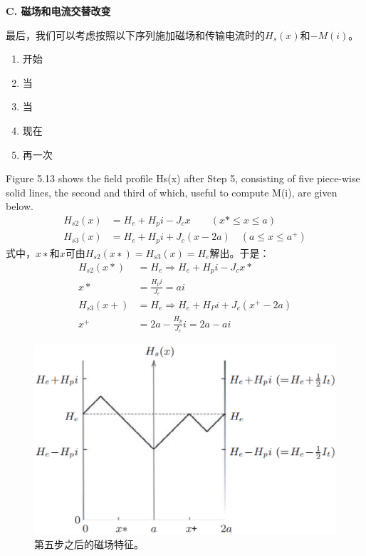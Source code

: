 \textbf{C. 磁场和电流交替改变}

最后，我们可以考虑按照以下序列施加磁场和传输电流时的$H_s(x)$和$−M(i)$。

\begin{enumerate}
	\item 开始
	\item 当
	\item 当
	\item 现在
	\item 再一次
\end{enumerate}

Figure 5.13 shows the field profile Hs(x) after Step 5, consisting of five piece-wise
solid lines, the second and third of which, useful to compute M(i), are given below.
\begin{align*}
H_{s2}(x)&=H_{e}+H_{p}i-J_{c}x\qquad(x*\leq x\leq a)\\
H_{s3}(x)&=H_{e}+H_{p}i+J_{c}(x-2a)\quad(a\leq x\leq a^{+})
\end{align*}
式中，$x∗$和$x$可由$H_{s2}(x∗)=H_{s3}(x)=H_e$解出。于是：
\begin{align*}
H_{s2}(x*)&=H_{e}\Rightarrow H_{e}+H_{p}i-J_{c}x*\\
x*&=\frac{H_{p}i}{J_{c}}=ai\\
H_{s3}(x+)&=H_{e}\Rightarrow H_{e}+H_{P}i+J_{c}(x^{+}-2a)\\
x^{+}&=2a-\frac{H_{p}}{J_{c}}i=2a-ai
\end{align*}

\begin{figure}[htbp]
	\centering
	\includegraphics[scale=0.5]{chpt5/figs/fig5.13.eps}
	\caption{第五步之后的磁场特征。}
\end{figure}

